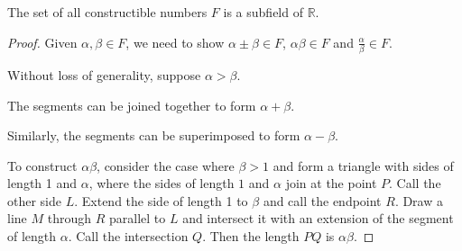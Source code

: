 \begin{theorem}
	The set of all constructible numbers $F$ is a subfield of $\mathbb R$.
\end{theorem}

\begin{proof}
	Given $\alpha,\beta\in F$, we need to show $\alpha\pm\beta\in F$, $\alpha\beta\in F$ and $\frac{\alpha}{\beta}\in F$.

	Without loss of generality, suppose $\alpha>\beta$.
	\begin{center}
	\end{center}

	The segments can be joined together to form $\alpha+\beta$.

	\begin{center}
	\end{center}

	Similarly, the segments can be superimposed to form $\alpha-\beta$.

	\begin{center}
	\end{center}

	To construct $\alpha\beta$, consider the case where $\beta>1$ and form a triangle with sides of length 1 and $\alpha$, where the sides of length $1$ and $\alpha$ join at the point $P$. Call the other side $L$. Extend the side of length 1 to $\beta$ and call the endpoint $R$. Draw a line $M$ through $R$ parallel to $L$ and intersect it with an extension of the segment of length $\alpha$. Call the intersection $Q$. Then the length $PQ$ is $\alpha\beta$.


\end{proof}
